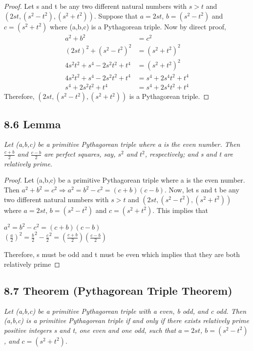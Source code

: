 \documentclass{article}
\begin{document}
\begin{proof}
Let s and t be any two different natural numbers with $s > t$ and $(2st,(s^2-t^2),(s^2+t^2))$. Suppose that $a = 2st$, $b = (s^2-t^2)$ and $c = (s^2+t^2)$ where (a,b,c) is a Pythagorean triple. Now by direct proof,
\begin{align*}
    && a^2 + b^2 &= c^2&&\\
    && (2st)^2 + (s^2-t^2)^2 &= (s^2+t^2)^2&&\\
    && 4s^2t^2 + s^4-2s^2t^2+t^4 &= (s^2+t^2)^2&&\\
    && 4s^2t^2 + s^4 - 2s^2t^2 + t^4 &= s^4 + 2s^4t^2 + t^4&&\\
    && s^4 + 2s^2t^2 + t^4 &= s^4 + 2s^4t^2 + t^4&&
\end{align*}
Therefore, $(2st,(s^2-t^2),(s^2+t^2))$ is a Pythagorean triple.
\end{proof}

\subsection*{8.6 Lemma} 
\quad \textit{Let (a,b,c) be a primitive Pythagorean triple where a is the even number. Then $\frac{c+b}{2}$ and $\frac{c-b}{2}$ are perfect squares, say, $s^2$ and $t^2$, respectively; and s and t are relatively prime.}

\begin{proof}
Let (a,b,c) be a primitive Pythagorean triple where a is the even number. Then $a^2 + b^2 = c^2 \Longrightarrow a^2 = b^2 - c^2 = (c+b)(c-b)$. Now, let s and t be any two different natural numbers with $s > t$ and $(2st,(s^2-t^2),(s^2+t^2))$ where $a = 2st$, $b = (s^2-t^2)$ and $c = (s^2+t^2)$. This implies that
\begin{center}
    $a^2 = b^2 - c^2 = (c+b)(c-b)$\\
    $(\frac{a}{2})^2 = \frac{b}{2}^2 - \frac{c}{2}^2 = (\frac{c+b}{2})(\frac{c-b}{2})$
\end{center}
Therefore, s must be odd and t must be even which implies that they are both relatively prime
\end{proof}

\subsection*{8.7 Theorem (Pythagorean Triple Theorem)} 
\quad \textit{Let (a,b,c) be a primitive Pythagorean triple with a even, b odd, and c odd. Then (a,b,c) is a primitive Pythagorean triple if and only if there exists relatively prime positive integers s and t, one even and one odd, such that $a = 2st$, $b = (s^2 - t^2)$, and $c = (s^2 + t^2)$.}
\end{document}
